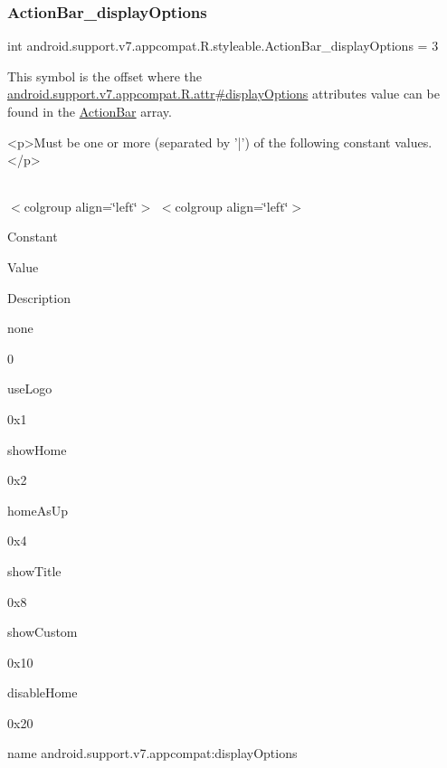 \subsubsection{\texorpdfstring{Action\+Bar\+\_\+display\+Options}{ActionBar\_displayOptions}}
{\footnotesize\ttfamily int android.\+support.\+v7.\+appcompat.\+R.\+styleable.\+Action\+Bar\+\_\+display\+Options = 3\hspace{0.3cm}{\ttfamily [static]}}

This symbol is the offset where the \hyperlink{classandroid_1_1support_1_1v7_1_1appcompat_1_1R_1_1attr_adc627bc21e2b2c5f1a2d582b13ddd6ca}{android.\+support.\+v7.\+appcompat.\+R.\+attr\#display\+Options} attribute\textquotesingle{}s value can be found in the \hyperlink{classandroid_1_1support_1_1v7_1_1appcompat_1_1R_1_1styleable_a5941dc15714398e9ec9afaa0155cc1cf}{Action\+Bar} array.

\begin{DoxyVerb}      <p>Must be one or more (separated by '|') of the following constant values.</p>
\end{DoxyVerb}
 \tabulinesep=1mm
\begin{longtabu} spread 0pt [c]{*{0}{|X[-1]}|}
\hline
\end{longtabu}
$<$colgroup align=\char`\"{}left\char`\"{}$>$ $<$colgroup align=\char`\"{}left\char`\"{}$>$ 

Constant

Value

Description 

{\ttfamily none}

0

{\ttfamily use\+Logo}

0x1

{\ttfamily show\+Home}

0x2

{\ttfamily home\+As\+Up}

0x4

{\ttfamily show\+Title}

0x8

{\ttfamily show\+Custom}

0x10

{\ttfamily disable\+Home}

0x20

name android.\+support.\+v7.\+appcompat\+:display\+Options \mbox{\label{classandroid_1_1support_1_1v7_1_1appcompat_1_1R_1_1styleable_a56617522d251eb5d5d0331d27015fb73}} 
